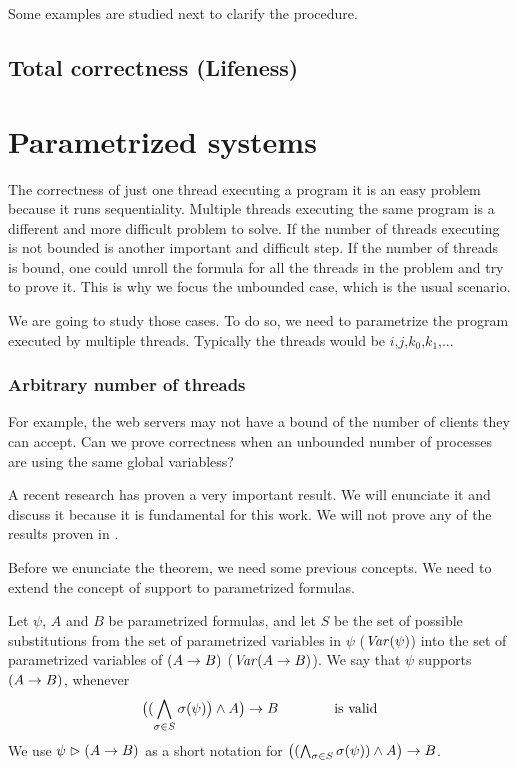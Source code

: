 Some examples are studied next to clarify the procedure.

\begin{example}

\end{example}



\subsection{Total correctness (Lifeness)}



\section{Parametrized systems}

The correctness of just one thread executing a program it is an easy problem because it runs sequentiality.
%
Multiple threads executing the same program is a different and more difficult problem to solve.
%
If the number of threads executing is not bounded is another important and difficult step.
%
If the number of threads is bound, one could unroll the formula for all the threads in the problem and try to prove it. 
%
This is why we focus the unbounded case, which is the usual scenario.

We are going to study those cases. 
%
To do so, we need to parametrize the program executed by multiple threads.
%
Typically the threads would be $i$,$j$,$k_0$,$k_1$,... 
%
\subsubsection{Arbitrary number of threads}

For example, the web servers may not have a bound of the number of clients they can accept.
%
Can we prove correctness when an unbounded number of processes are using the same global variabless?

A recent research  has proven a very important result. 
%
We will enunciate it and discuss it because it is fundamental for this work. 
%
We will not prove any of the results proven in \citep{paperParametrizedInvariants}.

Before we enunciate the theorem, we need some previous concepts.
%
We need to extend the concept of support to parametrized formulas.


\begin{defn}[Support]
  Let $\psi$, $A$ and $B$ be parametrized formulas, and let $S$ be the
  set of possible substitutions from the set of parametrized variables in $\psi$ ($\mathit{Var}(\psi)$) into the set of parametrized variables of $(A\mathrel{\rightarrow} B)$ ($\mathit{Var}(A\mathrel{\rightarrow} B)$).
%
  We say that $\psi$ supports $(A\mathrel{\rightarrow} B)$, whenever
%
  \[ \big( (\bigwedge_{\sigma\in S} \sigma(\psi)\big) \wedge A\big) \mathrel{\rightarrow} B \hspace{4em} \text{is valid} \]
%
  We use $\psi\mathrel{\rhd}(A\mathrel{\rightarrow} B)$ as a short notation for
  $\big((\bigwedge_{\sigma\in S} \sigma(\psi)) \wedge A\big) \mathrel{\rightarrow} B$.  
\end{defn}

